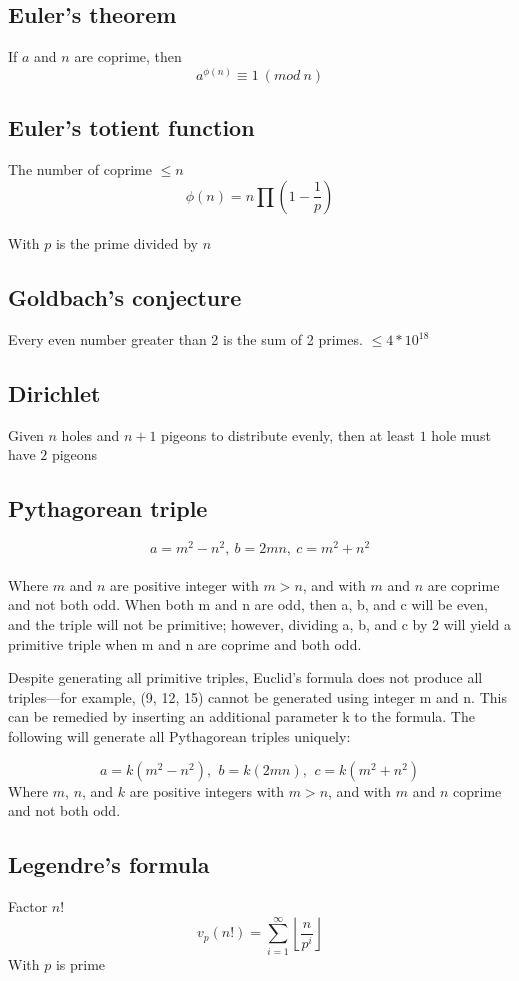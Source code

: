 \documentclass[A4 paper, 12pt, oneside, landscape]{article}
\begin{document}
\begin{multicols}{2}
	\subsection{Euler's theorem}
	If $a$ and $n$ are coprime, then 
	\[a ^ {\phi(n)} \equiv 1 \ (mod \ n) \]
	
	\subsection{Euler's totient function}
	The number of coprime $\leq n$ \\
	\[\phi(n) = n \prod (1 - \frac{1}{p}) \] \\
	With $p$ is the prime divided by $n$
	
	\subsection{Goldbach's conjecture}
	Every even number greater than 2 is the sum of 2 primes. \(\leq 4 * 10^{18}\)
	
	\subsection{Dirichlet}
	Given $n$ holes and $n + 1$ pigeons to distribute evenly, then at least $1$ hole must have $2$ pigeons
	
	\subsection{Pythagorean triple}
	\[a = m^2 - n^2, \ b = 2mn, \ c = m^2 + n^2 \] \\
	Where $m$ and $n$ are positive integer with $m > n$, and with $m$ and $n$ are coprime and not both odd. When both m and n are odd, then a, b, and c will be even, and the triple will not be primitive; however, dividing a, b, and c by 2 will yield a primitive triple when m and n are coprime and both odd.
	
	Despite generating all primitive triples, Euclid's formula does not produce all triples—for example, (9, 12, 15) cannot be generated using integer m and n. This can be remedied by inserting an additional parameter k to the formula. The following will generate all Pythagorean triples uniquely:

    \[a=k (m^{2}-n^{2}),\ \,b=k (2mn),\ \,c=k (m^{2}+n^{2}) \]
    Where $m$, $n$, and $k$ are positive integers with $m > n$, and with $m$ and $n$ coprime and not both odd.
	
	\subsection{Legendre's formula}
	Factor $n!$
	\[v_p(n!) = \sum_{i = 1}^{\infty} \left \lfloor \frac{n}{p ^ i} \right \rfloor \]
	With $p$ is prime
	

\end{multicols}
\end{document}
